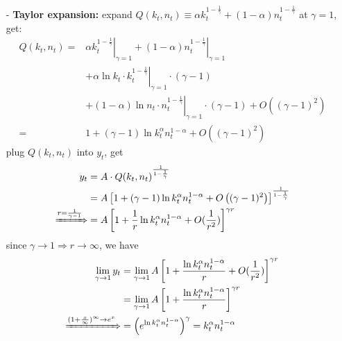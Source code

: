 \documentclass[10pt,landscape,a4paper]{article}
\begin{document}
\begin{multicols*}{3}
\begin{itemize}
\begin{itemize}
        \item[-] \textbf{Taylor expansion:} expand $Q(k_t,n_t)\equiv\alpha k_t^{1-\frac{1}{\gamma}}+(1-\alpha)n_t^{1-\frac{1}{\gamma}}$ at $\gamma=1$, get:
        \begin{align*}
            Q(k_t,n_t)= & \left.\alpha k_t^{1-\frac{1}{\gamma}}\right\vert_{\gamma=1}+\left.(1-\alpha)n_t^{1-\frac{1}{\gamma}}\right\vert_{\gamma=1}\\
            &+ \left.\alpha\ln k_t\cdot k_t^{1-\frac{1}{\gamma}}\right\vert_{\gamma=1}\cdot(\gamma-1)\\
            &+ \left. (1-\alpha)\ln n_t\cdot n_t^{1-\frac{1}{\gamma}} \right\vert_{\gamma=1}\cdot (\gamma-1) + O\left((\gamma-1)^2\right)\\
            = & 1+(\gamma-1)\ln k_t^{\alpha}n_t^{1-\alpha} +O\left((\gamma-1)^2\right)
        \end{align*}
        plug $Q(k_t,n_t)$ into $y_t$, get
        \begin{align*}
            y_t &= A\cdot Q(k_t,n_t)^{\frac{1}{1-\frac{1}{\gamma}}}\\
             &= A \left[1+(\gamma-1)\ln k_t^{\alpha}n_t^{1-\alpha} +O\left((\gamma-1)^2\right)\right]^{\frac{1}{1-\frac{1}{\gamma}}}\\
            \xRightarrow{r=\frac{1}{\gamma-1}} &= A\left[ 1+\frac{1}{r}\ln k_t^{\alpha}n_t^{1-\alpha} +O(\frac{1}{r^2}) \right]^{\gamma r}
        \end{align*}
        since $\gamma\rightarrow 1\Rightarrow r\rightarrow \infty$, we have 
        \begin{align*}
            \lim_{\gamma\rightarrow 1} y_t &= \lim_{\gamma\rightarrow 1} A\left[ 1+\frac{\ln k_t^{\alpha}n_t^{1-\alpha}}{r}+O(\frac{1}{r^2}) \right]^{\gamma r}\\
            &=\lim_{\gamma\rightarrow 1} A\left[ 1+\frac{\ln k_t^{\alpha}n_t^{1-\alpha}}{r} \right]^{\gamma r}\\
            \xRightarrow{(1+\frac{x}{\infty})^{\infty}\rightarrow e^x} & = \left(e^{\ln k_t^{\alpha}n_t^{1-\alpha}}\right)^{\gamma} = k_t^{\alpha}n_t^{1-\alpha}
        \end{align*}
    \end{itemize}
    

\end{itemize}
\end{multicols*}
\end{document}
